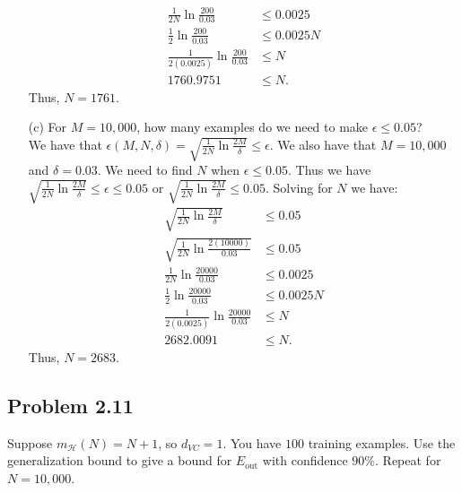\documentclass[a4paper]{article}
\begin{document}
\begin{itemize}
\begin{align*}
        \frac{1}{2N} \ln \frac{200}{0.03} &\leq 0.0025\\
        \frac{1}{2} \ln \frac{200}{0.03} &\leq 0.0025N\\
        \frac{1}{2(0.0025)} \ln \frac{200}{0.03} &\leq N\\
        1760.9751 &\leq N.
    \end{align*}
    Thus, $N = 1761$. 
    \item[(c)] For $M = 10,000$, how many examples do we need to make $\epsilon \leq 0.05$?\\
    We have that $\epsilon(M, N, \delta) = \sqrt{\frac{1}{2N} \ln \frac{2M}{\delta}} \leq 
    \epsilon$.  We also have that $M=10,000$ and $\delta = 0.03$.  We need to find $N$ when 
    $\epsilon \leq 0.05$.  Thus we have $\sqrt{\frac{1}{2N} \ln \frac{2M}{\delta}} \leq 
    \epsilon \leq 0.05$ or $\sqrt{\frac{1}{2N} \ln \frac{2M}{\delta}} \leq 0.05$.  Solving 
    for $N$ we have:
    \begin{align*}
        \sqrt{\frac{1}{2N} \ln \frac{2M}{\delta}} &\leq 0.05\\
        \sqrt{\frac{1}{2N} \ln \frac{2(10000)}{0.03}} &\leq 0.05\\
        \frac{1}{2N} \ln \frac{20000}{0.03} &\leq 0.0025\\
        \frac{1}{2} \ln \frac{20000}{0.03} &\leq 0.0025N\\
        \frac{1}{2(0.0025)} \ln \frac{20000}{0.03} &\leq N\\
        2682.0091 &\leq N.
    \end{align*}
    Thus, $N = 2683$.  
\end{itemize}


\subsection{Problem 2.11} Suppose $m_\mathcal{H}(N) = N + 1$, so $d_{VC} = 1$.  You have 
$100$ training examples.  Use the generalization bound to give a bound for $E_{\text{out}}$ 
with confidence $90\%$.  Repeat for $N = 10,000$.
\end{document}
